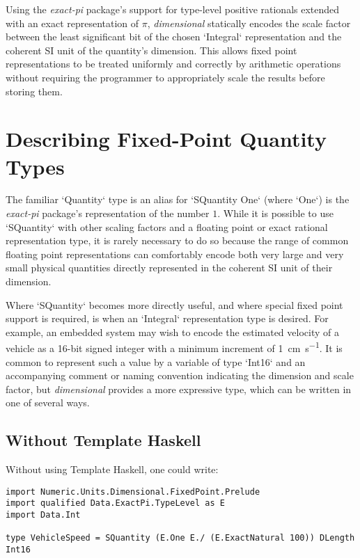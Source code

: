 \documentclass[11pt]{report}
\newcommand{\packagename}[1]{\textit{#1}}
\newcommand{\thispackage}{\packagename{dimensional}}
\begin{document}
Using the \packagename{exact-pi} package's support for type-level positive rationals extended with an exact representation
of $ \pi $, \thispackage{} statically encodes the scale factor between the least significant bit of the chosen `Integral`
representation and the coherent SI unit of the quantity's dimension. This allows fixed point representations to be
treated uniformly and correctly by arithmetic operations without requiring the programmer to appropriately scale the results
before storing them.

\section{Describing Fixed-Point Quantity Types}

The familiar `Quantity` type is an alias for `SQuantity One` (where `One`) is the \packagename{exact-pi}
package's representation of the number $ 1 $. While it is possible to use `SQuantity` with other scaling factors and a
floating point or exact rational representation type, it is rarely necessary to do so because the range of common floating
point representations can comfortably encode both very large and very small physical quantities directly represented in the
coherent SI unit of their dimension.

Where `SQuantity` becomes more directly useful, and where special fixed point support is required, is when an
`Integral` representation type is desired. For example, an embedded system may wish to encode the estimated
velocity of a vehicle as a 16-bit signed integer with a minimum increment of \SI{1}{\centi\meter\per\second}. It is common
to represent such a value by a variable of type `Int16` and an accompanying comment or naming convention indicating
the dimension and scale factor, but \thispackage{} provides a more expressive type, which can be written in one of several ways.

\subsection{Without Template Haskell}

Without using Template Haskell, one could write:

\begin{lstlisting}
import Numeric.Units.Dimensional.FixedPoint.Prelude
import qualified Data.ExactPi.TypeLevel as E
import Data.Int

type VehicleSpeed = SQuantity (E.One E./ (E.ExactNatural 100)) DLength Int16
\end{lstlisting}
\end{document}

